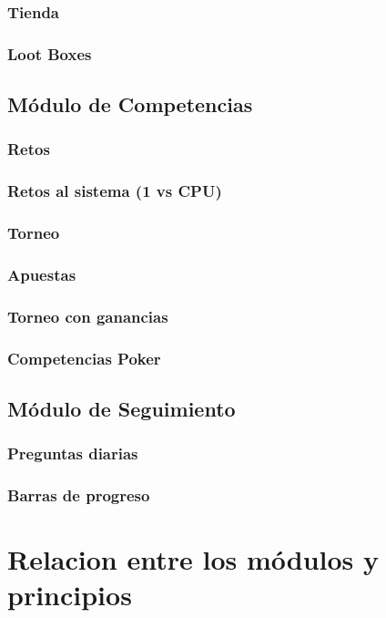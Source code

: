 \subsubsection{Tienda}
\subsubsection{Loot Boxes}

\subsection{Módulo de Competencias}

\subsubsection{Retos}
\subsubsection{Retos al sistema (1 vs CPU)}
\subsubsection{Torneo}
\subsubsection{Apuestas}
\subsubsection{Torneo con ganancias}
\subsubsection{Competencias Poker}

\subsection{Módulo de Seguimiento}

\subsubsection{Preguntas diarias}
\subsubsection{Barras de progreso}

\noindent 

\section{Relacion entre los módulos y principios}

